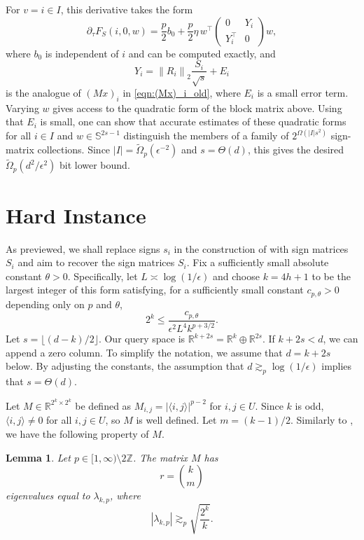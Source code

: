 \documentclass[11pt]{article}
\newtheorem{lemma}[theorem]{Lemma}
\theoremstyle{remark}
\theoremstyle{definition}
\newcommand{\Sph}{\mathbb{S}}
\newcommand{\R}{\mathbb{R}}
\newcommand{\eps}{\epsilon}
\newcommand{\ip}[2]{\langle #1,#2\rangle}
\newcommand{\norm}[1]{\left\|#1\right\|}
\begin{document}
For $v=i\in I$, this derivative takes the form
\[
	\partial_\tau F_S(i,0,w)
	=
	\frac p2 b_0
	+
	\frac p2 \eta\, w^\top
	\begin{pmatrix}
		0 & Y_i\\
		Y_i^\top & 0
	\end{pmatrix}
	w,
\]
where $b_0$ is independent of $i$ and can be computed exactly, and
\[
	Y_i
	=
	\norm{R_i}_2\frac{S_i}{\sqrt{s}}+E_i
\]
is the analogue of $(Mx)_i$ in \eqref{eqn:(Mx)_i_old}, where $E_i$ is a small error term. Varying $w$ gives access to the quadratic form of the block matrix above. Using that $E_i$ is small, one can show that accurate estimates of these quadratic forms for all $i\in I$ and $w\in\Sph^{2s-1}$ distinguish the members of a family of $2^{\Omega(|I|s^2)}$ sign-matrix collections. Since $|I|=\widetilde{\Omega}_p(\eps^{-2})$ and $s=\Theta(d)$, this gives the desired $\widetilde{\Omega}_p(d^2/\eps^2)$ bit lower bound.

\section{Hard Instance}
As previewed, we shall replace signs $s_i$ in the construction of \cite{LWW21} with sign matrices $S_i$ and aim to recover the sign matrices $S_i$. Fix a sufficiently small absolute constant $\theta>0$. Specifically, let $L\asymp \log(1/\eps)$ and choose $k=4h+1$ to be the largest integer of this form satisfying, for a sufficiently small constant $c_{p,\theta}>0$ depending only on $p$ and $\theta$,
\begin{equation}\label{eqn:assumption_k}
	2^k \leq \frac{c_{p,\theta}}{\eps^2 L^4 k^{p+3/2}}.
\end{equation}
Let $s = \lfloor (d-k)/2\rfloor$. Our query space is $\R^{k+2s} = \R^k \oplus \R^{2s}$. If $k + 2s < d$, we can append a zero column. To simplify the notation, we assume that $d = k+2s$ below. By adjusting the constants, the assumption that $d\gtrsim_p \log(1/\eps)$ implies that $s = \Theta(d)$.

Let $M\in\R^{2^k\times 2^k}$ be defined as $M_{i,j} = |\ip{i}{j}|^{p-2}$ for $i,j\in U$. Since $k$ is odd, $\ip{i}{j}\neq 0$ for all $i,j\in U$, so $M$ is well defined. Let $m = (k-1)/2$. 	Similarly to \cite{LWW21}, we have the following property of $M$.

\begin{lemma}\label{lem:eigenvalue}
Let $p\in [1,\infty)\setminus 2\mathbb{Z}$. The matrix $M$ has
\[
	r = \binom{k}{m}
\]
eigenvalues equal to $\lambda_{k,p}$, where
\[
	|\lambda_{k,p}| \gtrsim_p \sqrt{\frac{2^k}{k}}.
\]
\end{lemma}
\end{document}
